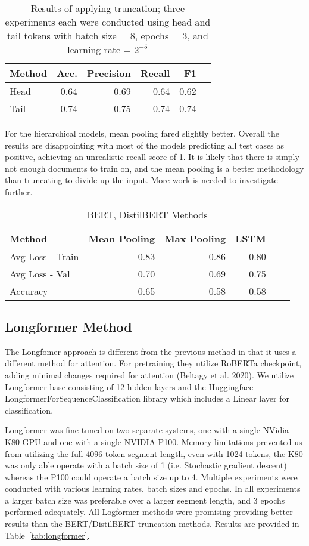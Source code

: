 \documentclass[twocolumn,10pt]{wmrDoc}
\begin{document}
\begin{table}
 \caption{Results of applying truncation; three experiments each were conducted using head and tail tokens with batch size = 8, epochs = 3, and learning rate = $2^{-5}$}
  \centering
  \begin{tabular}{lrrrrr}
    \toprule
    Method & Acc. & Precision & Recall & F1\\
    \midrule
    Head & 0.64 & 0.69 & 0.64 & 0.62 \\
    Tail & 0.74 & 0.75 & 0.74 & 0.74  \\
    \bottomrule
  \end{tabular}
  \label{tab:headtail}
\end{table}

For the hierarchical models, mean pooling fared slightly better. Overall the results are disappointing with most of the models predicting all test cases as positive, achieving an unrealistic recall score of 1. It is likely that there is simply not enough documents to train on, and the mean pooling is a better methodology than truncating to divide up the input. More work is needed to investigate further.


\begin{table}
 \caption{BERT, DistilBERT Methods}
  \centering
  \begin{tabular}{lrrrrr}
    \toprule
    Method & Mean Pooling & Max Pooling & LSTM \\
    \midrule
    Avg Loss - Train  & 0.83 & 0.86 & 0.80 \\
    Avg Loss - Val    & 0.70 & 0.69 & 0.75 \\
    Accuracy          & 0.65 & 0.58 & 0.58 \\
    \bottomrule
  \end{tabular}
  \label{tab:distilbert}
\end{table}

\subsection{Longformer Method}
The Longfomer approach is different from the previous method in that it uses a different method for attention. For pretraining they utilize RoBERTa \cite{roberta} checkpoint, adding minimal changes required for attention (Beltagy et al. 2020). We utilize Longformer base consisting of 12 hidden layers and the Huggingface LongformerForSequenceClassification library which includes a Linear layer for classification.

Longformer was fine-tuned on two separate systems, one with a single NVidia K80 GPU and one with a single NVIDIA P100. Memory limitations prevented us from utilizing the full 4096 token segment length, even with 1024 tokens, the K80 was only able operate with a batch size of 1 (i.e. Stochastic gradient descent) whereas the P100 could operate a batch size up to 4. Multiple experiments were conducted with various learning rates, batch sizes and epochs. In all experiments a larger batch size was preferable over a larger segment length, and 3 epochs performed adequately. All Logformer methods were promising providing better results than the BERT/DistilBERT truncation methods. Results are provided in Table~\ref{tab:longformer}.
\end{document}
